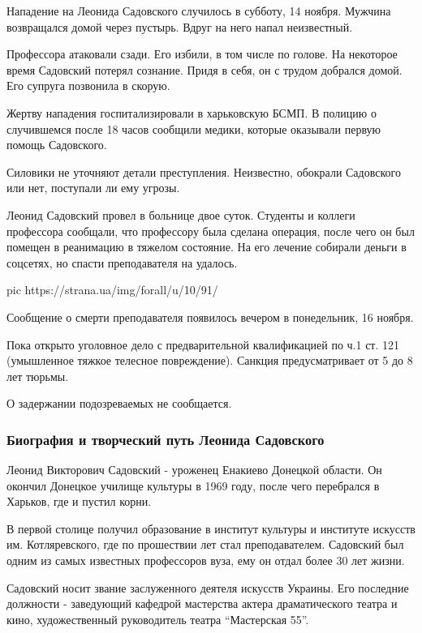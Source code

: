 Нападение на Леонида Садовского случилось в субботу, 14 ноября. Мужчина
возвращался домой через пустырь. Вдруг на него напал неизвестный. 

Профессора атаковали сзади. Его избили, в том числе по голове. На некоторое
время Садовский потерял сознание. Придя в себя, он с трудом добрался домой. Его
супруга позвонила в скорую. 

Жертву нападения госпитализировали в харьковскую БСМП. В полицию о случившемся
после 18 часов сообщили медики, которые оказывали первую помощь Садовского. 

Силовики не уточняют детали преступления. Неизвестно, обокрали Садовского или
нет, поступали ли ему угрозы. 

Леонид Садовский провел в больнице двое суток. Студенты и коллеги профессора
сообщали, что профессору была сделана операция, после чего он был помещен в
реанимацию в тяжелом состояние. На его лечение собирали деньги в соцсетях, но
спасти преподавателя на удалось.

\ifcmt
pic https://strana.ua/img/forall/u/10/91/%
\fi


Сообщение о смерти преподавателя появилось вечером в понедельник, 16
ноября. 

Пока открыто уголовное дело с предварительной квалификацией по ч.1 ст. 121
(умышленное тяжкое телесное повреждение). Санкция предусматривает от 5 до 8 лет
тюрьмы. 

О задержании подозреваемых не сообщается. 

\subsubsection{Биография и творческий путь Леонида Садовского  }

Леонид Викторович Садовский - уроженец Енакиево Донецкой области. Он
окончил Донецкое училище культуры в 1969 году, после чего перебрался в
Харьков, где и пустил корни.

В первой столице получил образование в институт культуры и институте
искусств им. Котляревского, где по прошествии лет стал преподавателем.
Садовский был одним из самых известных профессоров вуза, ему он отдал
более 30 лет жизни. 

Садовский носит звание заслуженного деятеля искусств Украины. Его
последние должности - заведующий кафедрой мастерства актера драматического
театра и кино, художественный руководитель театра \enquote{Мастерская 55}. 

